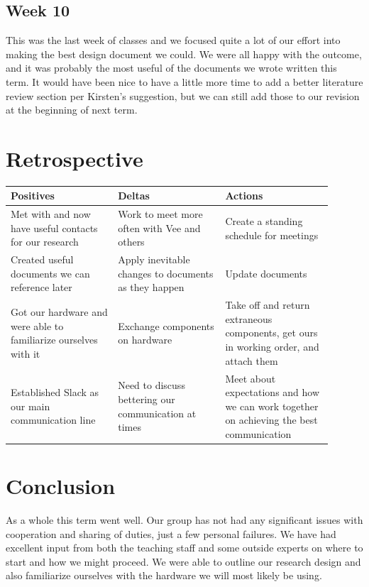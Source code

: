\documentclass[IEEEtran,letterpaper,10pt,notitlepage,draftclsnofoot,onecolumn]{article}
\begin{document}
\subsection{Week 10}
This was the last week of classes and we focused quite a lot of our effort into making the best design document we could.
We were all happy with the outcome, and it was probably the most useful of the documents we wrote written this term.
It would have been nice to have a little more time to add a better literature review section per Kirsten's suggestion, but we can still add those to our revision at the beginning of next term.

\section{Retrospective}

\begin{center}
\begin{tabular}{ |p{0.3\linewidth}|p{0.3\linewidth}|p{0.3\linewidth}| }
 \hline
 \centering Positives &
 \centering Deltas &
 \centering Actions \tabularnewline
 \hline
 Met with and now have useful contacts for our research &
 Work to meet more often with Vee and others &
 Create a standing schedule for meetings \tabularnewline
 \hline
 Created useful documents we can reference later &
 Apply inevitable changes to documents as they happen &
 Update documents \tabularnewline
 \hline
 Got our hardware and were able to familiarize ourselves with it &
 Exchange components on hardware &
 Take off and return extraneous components, get ours in working order, and attach them \tabularnewline
 \hline
 Established Slack as our main communication line &
 Need to discuss bettering our communication at times &
 Meet about expectations and how we can work together on achieving the best communication \tabularnewline
 \hline
\end{tabular}
\end{center}


\section{Conclusion}
As a whole this term went well.
Our group has not had any significant issues with cooperation and sharing of duties, just a few personal failures.
We have had excellent input from both the teaching staff and some outside experts on where to start and how we might proceed.
We were able to outline our research design and also familiarize ourselves with the hardware we will most likely be using.
\end{document}
